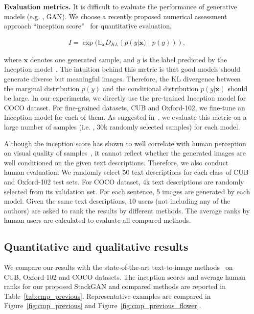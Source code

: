 \textbf{Evaluation metrics. } It is difficult to evaluate the performance of generative models (e.g. , GAN). We choose a recently proposed numerical assessment approach ``inception score''~\cite{Salimans2016} for quantitative evaluation,

\begin{equation}\label{eq:Inception_score}
\begin{aligned}
I = \exp(\mathbb{E}_{\bm{x}} D_{KL} (p(y|\bm{x}) \,||\, p(y))),
\end{aligned}
\end{equation}

where $\bm{x}$ denotes one generated sample, and $y$ is the label predicted by the Inception model~\cite{Szegedy2016}. The intuition behind this metric is that good models should generate diverse but meaningful images. Therefore, the KL divergence between the marginal distribution $p(y)$ and the conditional distribution $p(y|\bm{x})$ should be large. In our experiments, we directly use the pre-trained Inception model for COCO dataset. For fine-grained datasets, CUB and Oxford-102, we fine-tune an Inception model for each of them. As suggested in~\cite{Salimans2016}, we evaluate this metric on a large number of samples (i.e. , 30k randomly selected samples) for each model. 

Although the inception score has shown to well correlate with human perception on visual quality of samples~\cite{Salimans2016}, it cannot reflect whether the generated images are well conditioned on the given text descriptions. Therefore, we also conduct human evaluation. We randomly select 50 text descriptions for each class of CUB and Oxford-102 test sets. For COCO dataset, 4k text descriptions are randomly selected from its validation set. For each sentence, 5 images are generated by each model. Given the same text descriptions, 10 users (not including any of the authors) are asked to rank the results by different methods. The average ranks by human users are calculated to evaluate all compared methods.

\subsection{Quantitative and qualitative results}

We compare our results with the state-of-the-art text-to-image methods~\cite{reed2016learning, reed2016generative} on CUB, Oxford-102 and COCO datasets. The inception scores and average human ranks for our proposed StackGAN and compared methods are reported in Table~\ref{tab:cmp_previous}. Representative examples are compared in Figure~\ref{fig:cmp_previous} and Figure~\ref{fig:cmp_previous_flower}.

